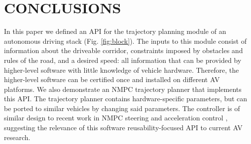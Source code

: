 \documentclass[letterpaper, 10 pt, conference]{ieeeconf}  %
\begin{document}
% 
% 
% 
% 
   
\section{CONCLUSIONS}

In this paper we defined an API for the trajectory planning module of an autonomous driving stack (Fig. \ref{fig:block}). The inputs to this module consist of information about the driveable corridor, constraints imposed by obstacles and rules of the road, and a desired speed: all information that can be provided by higher-level software with little knowledge of vehicle hardware. Therefore, the higher-level software can be certified once and installed on different AV platforms.
We also demonstrate an NMPC trajectory planner that implements this API. The trajectory planner contains hardware-specific parameters, but can be ported to similar vehicles by changing said parameters. The controller is of similar design to recent work in NMPC steering and acceleration control \cite{nmpc_micheli}, suggesting the relevance of this software reusability-focused API to current AV research.


\addtolength{\textheight}{-12cm}   %
\end{document}
